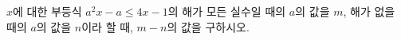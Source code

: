 $x$에 대한 부등식 $a^2x-a\le 4x-1$의 해가 모든 실수일 때의 $a$의 값을 $m$, 해가 없을 때의 $a$의 값을 $n$이라 할 때, $m-n$의 값을 구하시오. 
